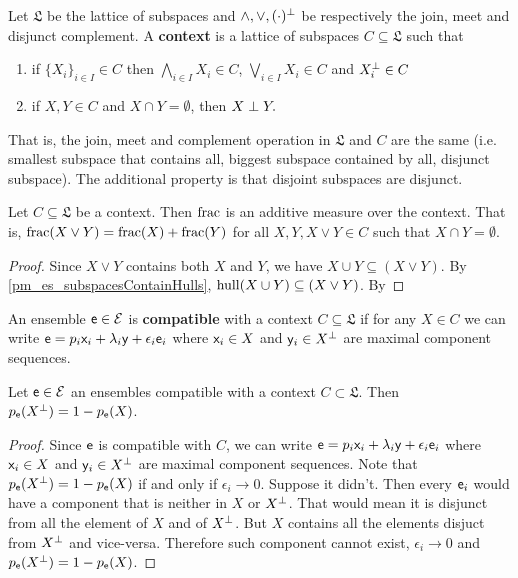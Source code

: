 \begin{defn}
	Let $\mathfrak{L}$ be the lattice of subspaces and $\wedge, \vee, (\cdot)^\disjunct$ be respectively the join, meet and disjunct complement. A \textbf{context} is a lattice of subspaces $C \subseteq \mathfrak{L}$ such that
	\begin{enumerate}
		\item if $\{X_i\}_{i \in I} \in C$ then $\bigwedge_{i \in I} X_i \in C$, $\bigvee_{i \in I} X_i \in C$ and $X_i^\disjunct \in C$
		\item if $X, Y \in C$ and $X \cap Y = \emptyset$, then $X \disjunct Y.$
	\end{enumerate}
	That is, the join, meet and complement operation in $\mathfrak{L}$ and $C$ are the same (i.e. smallest subspace that contains all, biggest subspace contained by all, disjunct subspace). The additional property is that disjoint subspaces are disjunct.
\end{defn}

\begin{prop}
	Let $C \subseteq \mathfrak{L}$ be a context. Then $\size$ is an additive measure over the context. That is, $\size(X \vee Y) = \size(X) + \size(Y)$ for all $X, Y, X \vee Y \in C$ such that $X \cap Y = \emptyset$.
\end{prop}

\begin{proof}
	Since $X \vee Y$ contains both $X$ and $Y$, we have $X \cup Y \subseteq(X \vee Y)$. By \ref{pm_es_subspacesContainHulls}, $\hull(X \cup Y) \subseteq(X \vee Y)$. By 
\end{proof}

\begin{defn}
	An ensemble $\ens \in \Ens$ is \textbf{compatible} with a context $C \subseteq \mathfrak{L}$ if for any $X \in C$ we can write $\ens = p_i \ens[x]_i + \lambda_i \ens[y] + \epsilon_i \ens_i$ where $\ens[x]_i \in X$ and $\ens[y]_i \in X^\disjunct$ are maximal component sequences.
\end{defn}

\begin{coro}
	Let $\ens \in \Ens$ an ensembles compatible with a context $C \subset \mathfrak{L}$. Then $p_{\ens}(X^\disjunct) = 1 - p_{\ens}(X)$.
\end{coro}

\begin{proof}
	Since $\ens$ is compatible with $C$, we can write $\ens = p_i \ens[x]_i + \lambda_i \ens[y] + \epsilon_i \ens_i$ where $\ens[x]_i \in X$ and $\ens[y]_i \in X^\disjunct$ are maximal component sequences. Note that $p_{\ens}(X^\disjunct) = 1 - p_{\ens}(X)$ if and only if $\epsilon_i \to 0$. Suppose it didn't. Then every $\ens_i$ would have a component that is neither in $X$ or $X^\disjunct$. That would mean it is disjunct from all the element of $X$ and of $X^\disjunct$. But $X$ contains all the elements disjuct from $X^\disjunct$ and vice-versa. Therefore such component cannot exist, $\epsilon_i \to 0$ and $p_{\ens}(X^\disjunct) = 1 - p_{\ens}(X)$.
\end{proof}

